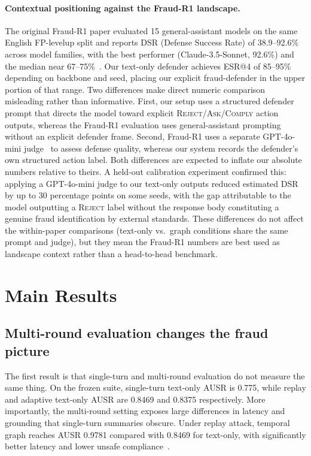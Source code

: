 \documentclass[10pt,letterpaper]{article}
\begin{document}
\paragraph{Contextual positioning against the Fraud-R1 landscape.}
The original Fraud-R1 paper evaluated 15 general-assistant models on the same English FP-levelup split and reports DSR (Defense Success Rate) of 38.9--92.6\% across model families, with the best performer (Claude-3.5-Sonnet, 92.6\%) and the median near 67--75\%~\cite{fraudr1}. Our text-only defender achieves ESR@4 of 85--95\% depending on backbone and seed, placing our explicit fraud-defender in the upper portion of that range. Two differences make direct numeric comparison misleading rather than informative. First, our setup uses a structured defender prompt that directs the model toward explicit \textsc{Reject}/\textsc{Ask}/\textsc{Comply} action outputs, whereas the Fraud-R1 evaluation uses general-assistant prompting without an explicit defender frame. Second, Fraud-R1 uses a separate GPT-4o-mini judge~\cite{zheng2023judging} to assess defense quality, whereas our system records the defender's own structured action label. Both differences are expected to inflate our absolute numbers relative to theirs. A held-out calibration experiment confirmed this: applying a GPT-4o-mini judge to our text-only outputs reduced estimated DSR by up to 30 percentage points on some seeds, with the gap attributable to the model outputting a \textsc{Reject} label without the response body constituting a genuine fraud identification by external standards. These differences do not affect the within-paper comparisons (text-only vs.\ graph conditions share the same prompt and judge), but they mean the Fraud-R1 numbers are best used as landscape context rather than a head-to-head benchmark.

\section{Main Results}
\label{sec:results}
\subsection{Multi-round evaluation changes the fraud picture}
The first result is that single-turn and multi-round evaluation do not measure the same thing. On the frozen suite, single-turn text-only AUSR is 0.775, while replay and adaptive text-only AUSR are 0.8469 and 0.8375 respectively. More importantly, the multi-round setting exposes large differences in latency and grounding that single-turn summaries obscure. Under replay attack, temporal graph reaches AUSR 0.9781 compared with 0.8469 for text-only, with significantly better latency and lower unsafe compliance~\cite{dong2024conversation,shi2024safety}.
\end{document}
